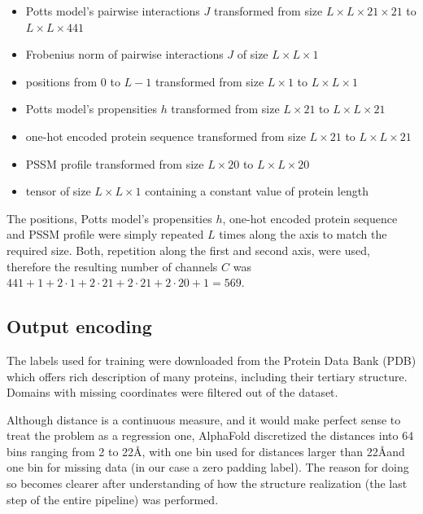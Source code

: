 \begin{itemize}
    \item Potts model's pairwise interactions $J$ transformed from size $L \times L \times 21 \times 21$ to $L \times L \times 441$
    \item Frobenius norm of pairwise interactions $J$ of size $L \times L \times 1$
    \item positions from $0$ to $L-1$ transformed from size $L \times 1$ to $L \times L \times 1$
    \item Potts model's propensities $h$ transformed from size $L \times 21$ to $L \times L \times 21$
    \item one-hot encoded protein sequence transformed from size $L \times 21$ to $L \times L \times 21$
    \item PSSM profile transformed from size $L \times 20$ to $L \times L \times 20$
    \item tensor of size $L \times L \times 1$ containing a constant value of protein length
\end{itemize}

The positions, Potts model's propensities $h$, one-hot encoded protein sequence and PSSM profile were simply repeated $L$ times along the axis to match the required size.
Both, repetition along the first and second axis, were used, therefore the resulting number of channels $C$ was $441 + 1 + 2 \cdot 1 + 2 \cdot 21 + 2 \cdot 21 + 2 \cdot 20 + 1 = 569$. 

\subsection{Output encoding}

The labels used for training were downloaded from the Protein Data Bank (PDB) which offers rich description of many proteins, including their tertiary structure. Domains with missing coordinates were filtered out of the dataset.
        

Although distance is a continuous measure, and it would make perfect sense to treat the problem as a regression one, AlphaFold discretized the distances into 64 bins ranging from 2 to 22\AA, with one bin used for distances larger than 22\AA and one bin for missing data (in our case a zero padding label). 
The reason for doing so becomes clearer after understanding of how the structure realization (the last step of the entire pipeline) was performed.

